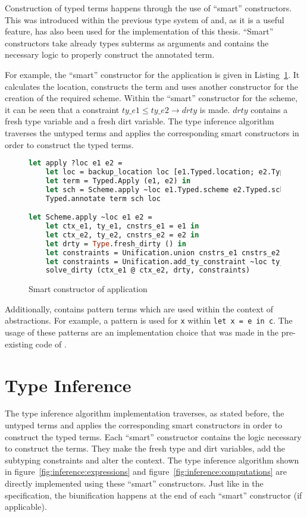 Construction of typed terms happens through the use of ``smart'' constructors. This was introduced within the previous type system of \eff and, as it is a useful feature, has also been used for the implementation of this thesis. ``Smart'' constructors take already types subterms as arguments and contains the necessary logic to properly construct the annotated term. 

For example, the ``smart'' constructor for the application is given in Listing~\ref{lst:smart}. It calculates the location, constructs the term and uses another constructor for the creation of the required scheme. Within the ``smart'' constructor for the scheme, it can be seen that a constraint $ty\_e1 \le ty\_e2 \to drty$ is made. $drty$ contains a fresh type variable and a fresh dirt variable. The type inference algorithm traverses the untyped terms and applies the corresponding smart constructors in order to construct the typed terms. 

\begin{figure}
\caption{Smart constructor of application}
\label{lst:smart}
\begin{lstlisting}[language=Caml]
let apply ?loc e1 e2 =
    let loc = backup_location loc [e1.Typed.location; e2.Typed.location] in
    let term = Typed.Apply (e1, e2) in
    let sch = Scheme.apply ~loc e1.Typed.scheme e2.Typed.scheme in
    Typed.annotate term sch loc

let Scheme.apply ~loc e1 e2 =
    let ctx_e1, ty_e1, cnstrs_e1 = e1 in
    let ctx_e2, ty_e2, cnstrs_e2 = e2 in
    let drty = Type.fresh_dirty () in
    let constraints = Unification.union cnstrs_e1 cnstrs_e2  in
    let constraints = Unification.add_ty_constraint ~loc ty_e1 (Type.Arrow (ty_e2, drty)) constraints in
    solve_dirty (ctx_e1 @ ctx_e2, drty, constraints)
\end{lstlisting}
\end{figure}

Additionally, \eff contains pattern terms which are used within the context of abstractions. For example, a pattern is used for \lstinline{x} within \lstinline{let x = e in c}. The usage of these patterns are an implementation choice that was made in the pre-existing code of \eff. 

\section{Type Inference}
The type inference algorithm implementation traverses, as stated before, the untyped terms and applies the corresponding smart constructors in order to construct the typed terms. Each ``smart'' constructor contains the logic necessary to construct the terms. They make the fresh type and dirt variables, add the subtyping constraints and alter the context. The type inference algorithm shown in figure~\ref{fig:inference:expressions} and figure~\ref{fig:inference:computations} are directly implemented using these ``smart'' constructors. Just like in the specification, the biunification happens at the end of each ``smart'' constructor (if applicable).

